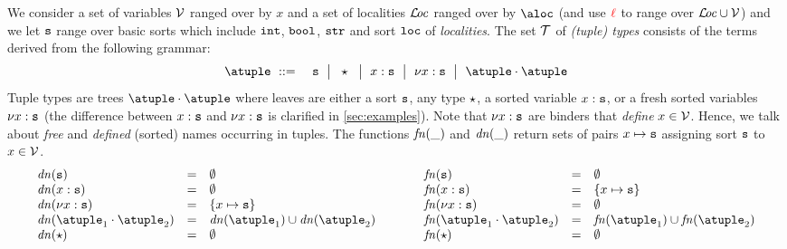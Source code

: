 %

We consider a set of variables $\varset$  ranged over by $x$
and a set of localities $\locset$ ranged over by $\aloc$ (and
use $\alocvar$ to range over $\locset\cup\varset$) and we let $\asort$
range over basic sorts which include $\asort[int]$, $\asort[bool]$,
$\asort[str]$ and sort $\asort[loc]$ of \emph{localities}.
%
The set $\tupleset$ of \emph{(tuple) types} consists of the terms
derived from the following grammar:
\begin{eqnarray*}
  \atuple & \bnfdef & \asort \bnfmid
                        \wildcard\bnfmid
                      x : \asort \bnfmid
                      \nu x : \asort  \bnfmid
                      \atuple \cdot \atuple 
\end{eqnarray*}
Tuple types are trees  $\atuple \cdot \atuple$  where leaves are
 either a sort $\asort$, any type $\wildcard$,  a sorted variable $x : \asort$,
or a fresh sorted variables $\nu x : \asort$ 
(the difference between $x : \asort$ and $\nu x : \asort$ is clarified in \cref{sec:examples}).
Note that $\nu x : \asort$ are binders that \emph{define}
$x \in \varset$. 
%
Hence, we talk about \emph{free} and \emph{defined} (sorted) names occurring in
tuples.
%
%
The functions $\fn{\_}$ and $\dn{\_}$ return sets of pairs
$x \mapsto \asort$ assigning sort $\asort$ to $x \in \varset$.
\[
\begin{array}{l@{\hspace{1cm}}l}
\begin{array}{lcl}
  \dn\asort & = & \emptyset
  \\
  \dn{x : \asort} & = & \emptyset
  \\
  \dn{\nu x : \asort} & = & \{x \mapsto \asort \}
  \\
  \dn{\atuple_1 \cdot \atuple_2} & = & \dn{\atuple_1} \cup \dn{\atuple_2}
  \\
  \dn{\wildcard} & = & \emptyset
\end{array}
&
\begin{array}{lcl}
  \fn\asort & = & \emptyset
  \\
  \fn{x : \asort} & = &  \{x \mapsto \asort\}
  \\
  \fn{\nu x : \asort} & = & \emptyset
  \\
  \fn{\atuple_1 \cdot \atuple_2} & = & \fn{\atuple_1} \cup \fn{\atuple_2}
  \\
  \fn{\wildcard} & = & \emptyset
\end{array}
\end{array}
\]
